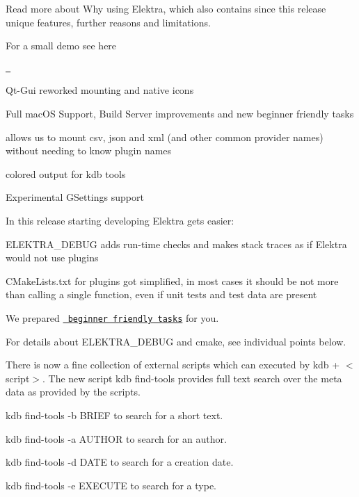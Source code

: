 Read more about Why using Elektra, which also contains since this release unique features, further reasons and limitations.

For a small demo see here

\href{https://asciinema.org/a/cantr04assr4jkv8v34uz9b8r}{\texttt{ }}


\begin{DoxyItemize}
\item Qt-\/\+Gui reworked mounting and native icons
\item Full mac\+OS Support, Build Server improvements and new beginner friendly tasks
\item allows us to mount csv, json and xml (and other common provider names) without needing to know plugin names
\item colored output for kdb tools
\item Experimental G\+Settings support
\end{DoxyItemize}

In this release starting developing Elektra gets easier\+:


\begin{DoxyItemize}
\item {\ttfamily E\+L\+E\+K\+T\+R\+A\+\_\+\+D\+E\+B\+UG} adds run-\/time checks and makes stack traces as if Elektra would not use plugins
\item {\ttfamily C\+Make\+Lists.\+txt} for plugins got simplified, in most cases it should be not more than calling a single function, even if unit tests and test data are present
\item We prepared \href{https://github.com/ElektraInitiative/libelektra/issues?q=is%3Aissue+is%3Aopen+label%3A%22beginner+friendly%22}{\texttt{ beginner friendly tasks}} for you.
\end{DoxyItemize}

For details about {\ttfamily E\+L\+E\+K\+T\+R\+A\+\_\+\+D\+E\+B\+UG} and cmake, see individual points below.

There is now a fine collection of external scripts which can executed by {\ttfamily kdb + $<$script$>$}. The new script {\ttfamily kdb find-\/tools} provides full text search over the meta data as provided by the scripts.


\begin{DoxyItemize}
\item {\ttfamily kdb find-\/tools -\/b B\+R\+I\+EF} to search for a short text.
\item {\ttfamily kdb find-\/tools -\/a A\+U\+T\+H\+OR} to search for an author.
\item {\ttfamily kdb find-\/tools -\/d D\+A\+TE} to search for a creation date.
\item {\ttfamily kdb find-\/tools -\/e E\+X\+E\+C\+U\+TE} to search for a type.
\end{DoxyItemize}

